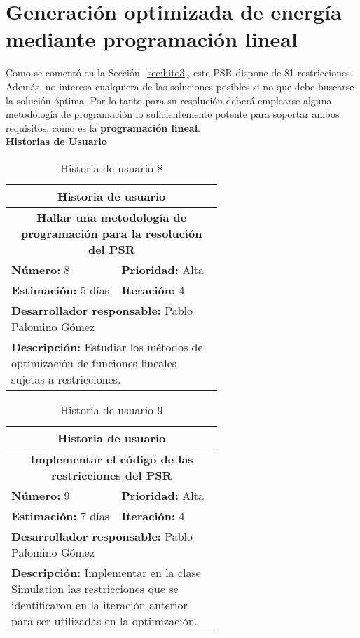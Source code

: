 
\section{Generación optimizada de energía mediante programación lineal}
\label{sec:hito4}
Como se comentó en la Sección~\ref{sec:hito3}, este \gls{PSR} dispone de 81 restricciones. Además, no interesa cualquiera de las soluciones posibles si no que debe buscarse la solución óptima. Por lo tanto para su resolución deberá emplearse alguna metodología de programación lo suficientemente potente para soportar ambos requisitos, como es la \textbf{programación lineal}.\\

\textbf{Historias de Usuario}\\

\begin{table}[H]
        \centering
        \begin{tabular}{|p{0.3\linewidth}|p{0.3\linewidth}|}
          \hline
          \multicolumn{2}{|c|}{Historia de usuario}\\ \hline
          \multicolumn{2}{|c|}{\textbf{Hallar una metodología de programación para la resolución del PSR}}\\ \hline
          \textbf{Número:} 8 & \textbf{Prioridad:} Alta\\ \hline
          \textbf{Estimación:} 5 días & \textbf{Iteración:} 4\\ \hline
          \multicolumn{2}{|l|}{\textbf{Desarrollador responsable:} Pablo Palomino Gómez}\\ \hline
          \multicolumn{2}{|p{0.8\linewidth}|}{\textbf{Descripción:} Estudiar los métodos de optimización de funciones lineales sujetas a restricciones.}\\ \hline
        \end{tabular}
        \caption{Historia de usuario 8}
        \label{tab:hist8}
\end{table}
\begin{table}[H]
        \centering
        \begin{tabular}{|p{0.3\linewidth}|p{0.3\linewidth}|}
          \hline
          \multicolumn{2}{|c|}{Historia de usuario}\\ \hline
          \multicolumn{2}{|c|}{\textbf{Implementar el código de las restricciones del PSR}}\\ \hline
          \textbf{Número:} 9 & \textbf{Prioridad:} Alta\\ \hline
          \textbf{Estimación:} 7 días & \textbf{Iteración:} 4\\ \hline
          \multicolumn{2}{|l|}{\textbf{Desarrollador responsable:} Pablo Palomino Gómez}\\ \hline
          \multicolumn{2}{|p{0.8\linewidth}|}{\textbf{Descripción:} Implementar en la clase Simulation las restricciones que se identificaron en la iteración anterior para ser utilizadas en la optimización.}\\ \hline
        \end{tabular}
        \caption{Historia de usuario 9}
        \label{tab:hist9}
\end{table}
